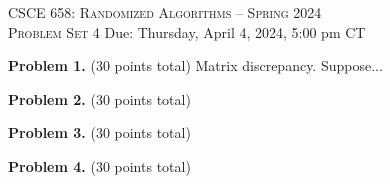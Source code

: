 \documentclass[11pt]{article}
\begin{document}
\begin{center}
{\Large\textsc{CSCE 658: Randomized Algorithms -- Spring 2024 \\ 
Problem Set 4}}
\vskip 0.1in
Due: Thursday, April 4, 2024, 5:00 pm CT
\end{center}

\noindent
\textbf{Problem 1.} (30 points total)
Matrix discrepancy.
\vskip 0.1in\noindent
Suppose...

\vskip 0.2in\noindent
\textbf{Problem 2.} (30 points total)

\vskip 0.2in\noindent
\textbf{Problem 3.} (30 points total)

\vskip 0.2in\noindent
\textbf{Problem 4.} (30 points total)
\end{document}
